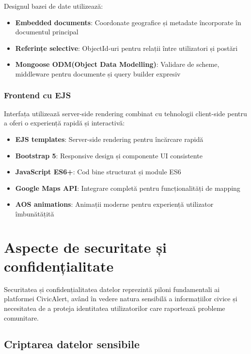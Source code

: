 \documentclass[12pt,a4paper]{report}
\begin{document}
Designul bazei de date utilizează:

\begin{itemize}
    \item \textbf{Embedded documents}: Coordonate geografice și metadate încorporate în documentul principal
    \item \textbf{Referințe selective}: ObjectId-uri pentru relații între utilizatori și postări
    \item \textbf{Mongoose ODM(Object Data Modelling)}: Validare de scheme, middleware pentru documente și query builder expresiv
\end{itemize}

\subsubsection{Frontend cu EJS}

Interfața utilizează server-side rendering combinat cu tehnologii client-side pentru a oferi o experiență rapidă și interactivă:

\begin{itemize}
    \item \textbf{EJS templates}: Server-side rendering pentru încărcare rapidă 
    \item \textbf{Bootstrap 5}: Responsive design și componente UI consistente
    \item \textbf{JavaScript ES6+}: Cod bine structurat și module ES6
    \item \textbf{Google Maps API}: Integrare completă pentru funcționalități de mapping
    \item \textbf{AOS animations}: Animații moderne pentru experiență utilizator îmbunătățită
\end{itemize}

\section{Aspecte de securitate și confidențialitate}

Securitatea și confidențialitatea datelor reprezintă piloni fundamentali ai platformei CivicAlert, având în vedere natura sensibilă a informațiilor civice și necesitatea de a proteja identitatea utilizatorilor care raportează probleme comunitare.

\subsection{Criptarea datelor sensibile}
\end{document}
